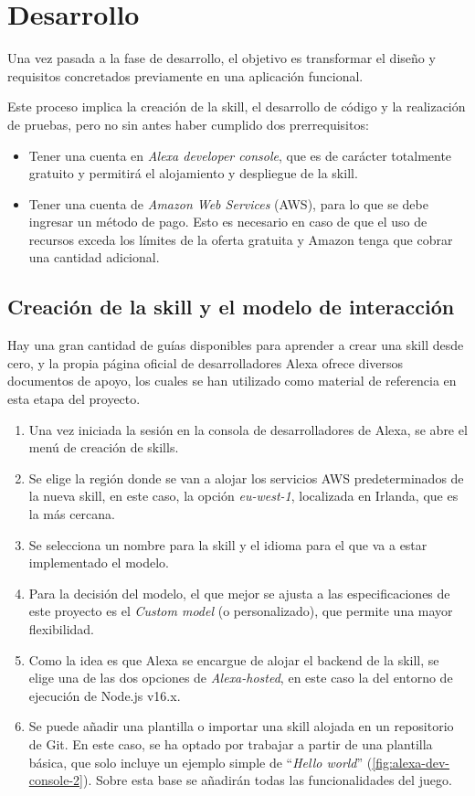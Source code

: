 \section{Desarrollo}

Una vez pasada a la fase de desarrollo, el objetivo es transformar el diseño y requisitos concretados previamente en una aplicación funcional. 

Este proceso implica la creación de la skill, el desarrollo de código y la realización de pruebas, pero no sin antes haber cumplido dos prerrequisitos:
\begin{itemize}
	\item Tener una cuenta en \textit{Alexa developer console}, que es de carácter totalmente gratuito y permitirá el alojamiento y despliegue de la skill. 
	\item Tener una cuenta de \textit{Amazon Web Services} (AWS), para lo que se debe ingresar un método de pago. Esto es necesario en caso de que el uso de recursos exceda los límites de la oferta gratuita y Amazon tenga que cobrar una cantidad adicional.
\end{itemize}

\subsection{Creación de la skill y el modelo de interacción}

Hay una gran cantidad de guías disponibles para aprender a crear una skill desde cero, y la propia página oficial de desarrolladores Alexa \parencite{alexaHosted} ofrece diversos documentos de apoyo, los cuales se han utilizado como material de referencia en esta etapa del proyecto.

\begin{enumerate}
	\item Una vez iniciada la sesión en la consola de desarrolladores de Alexa, se abre el menú de creación de skills.
	\item Se elige la región donde se van a alojar los servicios AWS predeterminados de la nueva skill, en este caso, la opción \textit{eu-west-1}, localizada en Irlanda, que es la más cercana.
	\item Se selecciona un nombre para la skill y el idioma para el que va a estar implementado el modelo.
	\item Para la decisión del modelo, el que mejor se ajusta a las especificaciones de este proyecto es el \textit{Custom model} (o personalizado), que permite una mayor flexibilidad.
	\item Como la idea es que Alexa se encargue de alojar el backend de la skill, se elige una de las dos opciones de \textit{Alexa-hosted}, en este caso la del entorno de ejecución de Node.js v16.x.
	\item Se puede añadir una plantilla o importar una skill alojada en un repositorio de Git. En este caso, se ha optado por trabajar a partir de una plantilla básica, que solo incluye un ejemplo simple de \enquote{\textit{Hello world}} (\autoref{fig:alexa-dev-console-2}). Sobre esta base se añadirán todas las funcionalidades del juego.
\end{enumerate}

